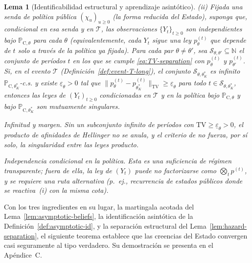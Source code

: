 \documentclass[review,authoryear,12pt]{elsarticle}
\theoremstyle{plain}
\newtheorem{lemma}[theorem]{Lema}
\theoremstyle{definition}
\newcommand{\ProbC}[1]{\mathbb{P}_{\mathrm{C},#1}}
\newcommand{\1}{\mathbf{1}}
\begin{document}
\begin{lemma}[Identificabilidad estructural y aprendizaje asintótico]
\medskip
\noindent\textup{(ii)}
Fijada una senda de política pública $(\chi_u)_{u\ge 0}$ \textup{(}la forma reducida del Estado\textup{)}, suponga que, condicional en esa senda y en $\mathcal{T}$, las observaciones $\{Y_t\}_{t\ge 0}$ son independientes bajo $\ProbC{\theta}$ para cada $\theta$ \textup{(}equivalentemente, cada $Y_t$ sigue una ley $p_\theta^{(t)}$ que depende de $t$ solo a través de la política ya fijada\textup{)}. Para cada par $\theta\neq\theta'$, sea $\mathcal{S}_{\theta,\theta'}\subseteq\mathbb{N}$ el conjunto de períodos $t$ en los que se cumple \eqref{eq:TV-separation} con $p_\theta^{(t)}$ y $p_{\theta'}^{(t)}$. Si, en el evento $\mathcal{T}$ \textup{(}Definición~\ref{def:event-T-long}\textup{)}, el conjunto $\mathcal{S}_{\theta,\theta_K^\ast}$ es infinito $\ProbC{\theta_K^\ast}$-c.s. y existe $\underline{\varepsilon}_{\theta}>0$ tal que $\|p_\theta^{(t)}-p_{\theta_K^\ast}^{(t)}\|_{\mathrm{TV}}\ge \underline{\varepsilon}_{\theta}$ para todo $t\in\mathcal{S}_{\theta,\theta_K^\ast}$, entonces las leyes de $(Y_t)_{t\ge 0}$ condicionadas en $\mathcal{T}$ y en la política bajo $\ProbC{\theta}$ y bajo $\ProbC{\theta_K^\ast}$ son mutuamente singulares.

\medskip
\begin{list}{}{%
  \setlength{\leftmargin}{2.25em}%
  \setlength{\labelwidth}{2.25em}%
  \setlength{\labelsep}{0.45em}%
  \setlength{\itemsep}{0.35em}%
  \setlength{\parsep}{0pt}%
  \setlength{\topsep}{0.25em}%
}
\item[\textup{(C3)}] \textup{Infinitud y margen.}\quad
Sin un subconjunto infinito de períodos con $\mathrm{TV}\ge\underline{\varepsilon}_\theta>0$, el producto de afinidades de Hellinger no se anula, y el criterio de \citet{Kakutani1948} no fuerza, por sí solo, la singularidad entre las leyes producto.
\item[\textup{(C4)}] \textup{Independencia condicional en la política.}\quad
Esta es una suficiencia de régimen transparente; fuera de ella, la ley de $(Y_t)$ puede no factorizarse como $\bigotimes_t p^{(t)}$, y se requiere una ruta alternativa \textup{(}p.\ ej., recurrencia de estados públicos donde se reactiva~\textup{(i)} con la misma cota\textup{)}.
\end{list}
\end{lemma}

Con los tres ingredientes en su lugar, la martingala acotada del Lema~\ref{lem:asymptotic-beliefs}, la identificación asintótica de la Definición~\ref{def:asymptotic-id}, y la separación estructural del Lema~\ref{lem:hazard-separation}, el siguiente teorema establece que las creencias del Estado convergen casi seguramente al tipo verdadero. Su demostración se presenta en el Apéndice~C.
\end{document}
